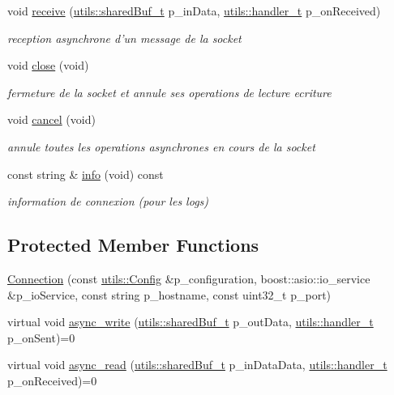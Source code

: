 \begin{DoxyCompactItemize}
void \hyperlink{classxtd_1_1network_1_1base_1_1Connection_a09146c9c2dbf1ad85867fd0afab15c0c}{receive} (\hyperlink{namespacextd_1_1network_1_1utils_a92b366b7e2a1ab09ac4f4a0401f8fb84}{utils\-::shared\-Buf\-\_\-t} p\-\_\-in\-Data, \hyperlink{namespacextd_1_1network_1_1utils_ac8a6f796cd645f83cde023d163665bb5}{utils\-::handler\-\_\-t} p\-\_\-on\-Received)
\begin{DoxyCompactList}\small\item\em reception asynchrone d'un message de la socket \end{DoxyCompactList}\item 
void \hyperlink{classxtd_1_1network_1_1base_1_1Connection_a73097d339a3716c05fee7ee19753ee4a}{close} (void)
\begin{DoxyCompactList}\small\item\em fermeture de la socket et annule ses operations de lecture ecriture \end{DoxyCompactList}\item 
void \hyperlink{classxtd_1_1network_1_1base_1_1Connection_a0bde1ab3f89862d0680c820645b7244d}{cancel} (void)
\begin{DoxyCompactList}\small\item\em annule toutes les operations asynchrones en cours de la socket \end{DoxyCompactList}\item 
const string \& \hyperlink{classxtd_1_1network_1_1base_1_1Connection_a6f249c285df79485b06f9c7b6ed03237}{info} (void) const 
\begin{DoxyCompactList}\small\item\em information de connexion (pour les logs) \end{DoxyCompactList}\end{DoxyCompactItemize}
\subsection*{Protected Member Functions}
\begin{DoxyCompactItemize}
\item 
\hyperlink{classxtd_1_1network_1_1base_1_1Connection_ac1ed59726de3423a3fc2e21e50d04542}{Connection} (const \hyperlink{classxtd_1_1network_1_1utils_1_1Config}{utils\-::\-Config} \&p\-\_\-configuration, boost\-::asio\-::io\-\_\-service \&p\-\_\-io\-Service, const string p\-\_\-hostname, const uint32\-\_\-t p\-\_\-port)
\item 
virtual void \hyperlink{classxtd_1_1network_1_1base_1_1Connection_a650bc7e13969ff9195c95307e0abb2e4}{async\-\_\-write} (\hyperlink{namespacextd_1_1network_1_1utils_a92b366b7e2a1ab09ac4f4a0401f8fb84}{utils\-::shared\-Buf\-\_\-t} p\-\_\-out\-Data, \hyperlink{namespacextd_1_1network_1_1utils_ac8a6f796cd645f83cde023d163665bb5}{utils\-::handler\-\_\-t} p\-\_\-on\-Sent)=0
\item 
virtual void \hyperlink{classxtd_1_1network_1_1base_1_1Connection_ab468f8470260b0ce42b5accf29c352e6}{async\-\_\-read} (\hyperlink{namespacextd_1_1network_1_1utils_a92b366b7e2a1ab09ac4f4a0401f8fb84}{utils\-::shared\-Buf\-\_\-t} p\-\_\-in\-Data\-Data, \hyperlink{namespacextd_1_1network_1_1utils_ac8a6f796cd645f83cde023d163665bb5}{utils\-::handler\-\_\-t} p\-\_\-on\-Received)=0
\end{DoxyCompactItemize}
